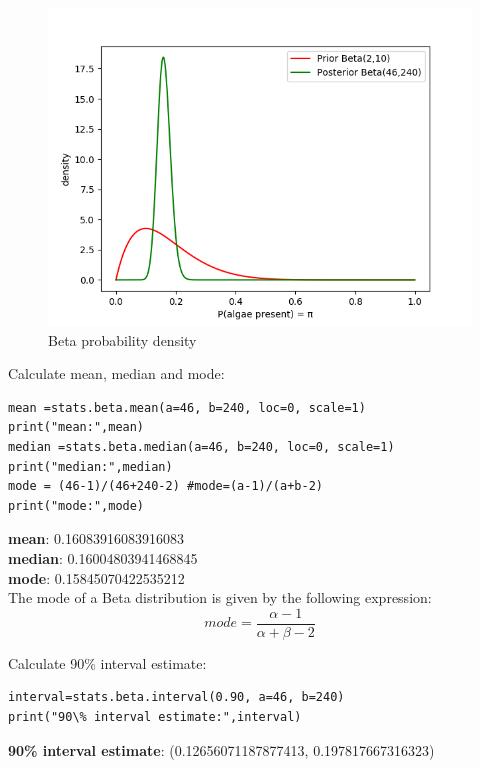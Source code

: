 \documentclass{article}
\begin{document}
\begin{figure}[H]
\centering  
\includegraphics[scale=0.6]{prob_distribution.png}
\caption{Beta probability density}
\label{fig: label}
\end{figure}

Calculate mean, median and mode:
\begin{verbatim}   
mean =stats.beta.mean(a=46, b=240, loc=0, scale=1)
print("mean:",mean)
median =stats.beta.median(a=46, b=240, loc=0, scale=1)
print("median:",median)
mode = (46-1)/(46+240-2) #mode=(a-1)/(a+b-2)
print("mode:",mode)
\end{verbatim}
\textbf{mean}: 0.16083916083916083\\
\textbf{median}: 0.16004803941468845\\
\textbf{mode}: 0.15845070422535212\\

The mode of a Beta distribution is given by the following expression:
\begin{equation}
mode=\frac{\alpha-1}{\alpha+\beta-2}
\end{equation}

Calculate 90\% interval estimate:
\begin{verbatim}   
interval=stats.beta.interval(0.90, a=46, b=240)
print("90\% interval estimate:",interval)
\end{verbatim}

\textbf{90\% interval estimate}: (0.12656071187877413, 0.197817667316323)\\
\end{document}
